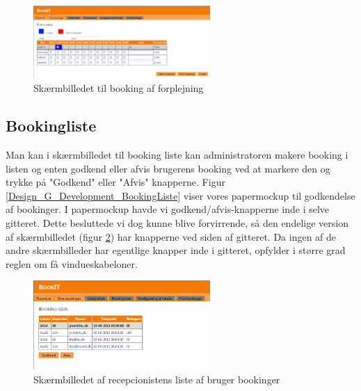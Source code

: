 \begin{figure}[h!]
  \centering
    \includegraphics[width=0.6\textwidth]{Appendix/GUI-Prototype/DigitalMockup/Forplejning}
  \caption{Skærmbilledet til booking af forplejning}
\label{Design_G_Development_Forplejning_Final}
\end{figure} 

\subsection{Bookingliste}
Man kan i skærmbilledet til booking liste kan administratoren makere booking i listen og enten godkend eller afvis brugerens booking ved at markere den og trykke på "Godkend" eller "Afvis" knapperne.
Figur \ref{Design_G_Development_BookingListe} viser vores papermockup til godkendelse af bookinger. 
I papermockup havde vi godkend/afvis-knapperne inde i selve gitteret. Dette besluttede vi dog kunne blive forvirrende, så den endelige version af skærmbilledet (figur \ref{Design_G_Development_BookingListe_Final}) har knapperne ved siden af gitteret. Da ingen af de andre skærmbilleder har egentlige knapper inde i gitteret, opfylder i større grad reglen om få vindueskabeloner.

\begin{figure}[h!]
  \centering
    \includegraphics[width=0.6\textwidth]{Appendix/GUI-Prototype/DigitalMockup/BookingListe}
  \caption{Skærmbilledet af recepcionistens liste af bruger bookinger}
\label{Design_G_Development_BookingListe_Final}
\end{figure} 

